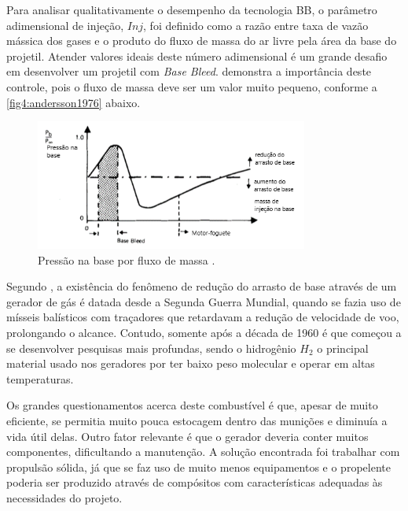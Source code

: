 Para analisar qualitativamente o desempenho da tecnologia BB, o parâmetro adimensional de injeção, \(Inj\), foi definido como a razão entre taxa de vazão mássica dos gases e o produto do fluxo de massa do ar livre pela área da base do projetil. Atender valores ideais deste número adimensional é um grande desafio em desenvolver um projetil com \textit{Base Bleed}. \citeauthor{Andersson1976} demonstra a importância deste controle, pois o fluxo de massa deve ser um valor muito pequeno, conforme a \autoref{fig4:andersson1976} abaixo.

\begin{figure}[!ht]
	\centering
	\includegraphics[width=0.8\textwidth]{foto04-grafico-andersson1976.png}
	\caption[Pressão na base por fluxo de massa.]{Pressão na base por fluxo de massa \cite{Andersson1976}.}
	\label{fig4:andersson1976}
\end{figure}

Segundo \citeauthor{Jelic2016Aug}, a existência do fenômeno de redução do arrasto de base através de um gerador de gás é datada desde a Segunda Guerra Mundial, quando se fazia uso de mísseis balísticos com traçadores que retardavam a redução de velocidade de voo, prolongando o alcance. Contudo, somente após a década de 1960 é que começou a se desenvolver pesquisas mais profundas, sendo o hidrogênio \(H_2\) o principal material usado nos geradores por ter baixo peso molecular e operar em altas temperaturas.

Os grandes questionamentos acerca deste combustível é que, apesar de muito eficiente, se permitia muito pouca estocagem dentro das munições e diminuía a vida útil delas. Outro fator relevante é que o gerador deveria conter muitos componentes, dificultando a manutenção. A solução encontrada foi trabalhar com propulsão sólida, já que se faz uso de muito menos equipamentos e o propelente poderia ser produzido através de compósitos com características adequadas às necessidades do projeto.

